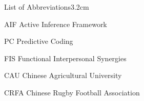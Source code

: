 \begin{mclistof}{List of Abbreviations}{3.2cm}

  \item[AIF] Active Inference Framework

  \item[PC] Predictive Coding
  \item[FIS] Functional Interpersonal Synergies
  \item[CAU] Chinese Agricultural University
  \item[CRFA] Chinese Rugby Football Association

\end{mclistof}
